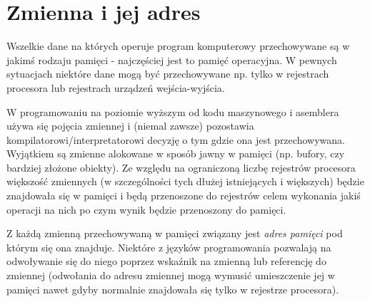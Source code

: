 % 
% 
% 
% 

\section{Zmienna i jej adres}

Wszelkie dane na których operuje program komputerowy przechowywane są w jakimś rodzaju pamięci - najczęściej jest to pamięć operacyjna. W pewnych sytuacjach niektóre dane mogą być przechowywane np. tylko w rejestrach procesora lub rejestrach urządzeń wejścia-wyjścia.

W programowaniu na poziomie wyższym od kodu maszynowego i asemblera używa się pojęcia zmiennej i (niemal zawsze) pozostawia kompilatorowi/interpretatorowi decyzję o tym gdzie ona jest przechowywana. Wyjątkiem są zmienne alokowane w sposób jawny w pamięci (np. bufory, czy bardziej złożone obiekty).
Ze względu na ograniczoną liczbę rejestrów procesora większość zmiennych (w szczególności tych dłużej istniejących i większych) będzie znajdowała się w pamięci i będą przenoszone do rejestrów celem wykonania jakiś operacji na nich po czym wynik będzie przenoszony do pamięci.

Z każdą zmienną przechowywaną w pamięci związany jest \emph{adres pamięci} pod którym się ona znajduje. Niektóre z języków programowania pozwalają na odwoływanie się do niego poprzez wskaźnik na zmienną lub referencję do zmiennej (odwołania do adresu zmiennej mogą wymusić umieszczenie jej w pamięci nawet gdyby normalnie znajdowała się tylko w rejestrze procesora).


